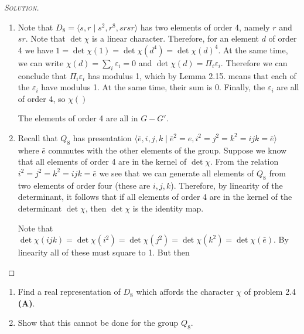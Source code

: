 \begin{proof}[{\scshape Solution}]
\begin{enumerate}[font=\normalfont,label=\textbf{(\Alph*)}, wide]
    \item Note that $D_8 = \langle s, r \mid s^2, r^8, srsr \rangle$ has two elements of order 4, namely $r$ and $sr$. Note that $\det{\chi}$ is a linear character. Therefore, for an element $d$ of order 4 we have $1 = \det{\chi}(1) = \det{\chi}(d^4) = \det{\chi}(d)^4$. At the same time, we can write $\chi(d) = \sum_i \varepsilon_i = 0$ and $\det{\chi}(d) = \Pi_i \varepsilon_i$. Therefore we can conclude that $\Pi_i \varepsilon_i$ has modulus 1, which by Lemma 2.15. means that each of the $\varepsilon_i$ have modulus 1. At the same time, their sum is 0. Finally, the $\varepsilon_i$ are all of order 4, so $\chi()$

    The elements of order 4 are all in $G - G'$.
    \item Recall that $Q_8$ has presentation
    $\langle \bar{e}, i, j, k \mid \bar{e}^2 = e, i^2 = j^2 = k^2 = ijk = \bar{e} \rangle$ where $\bar{e}$ commutes with the other elements of the group. Suppose we know that all elements of order 4 are in the kernel of $\det{\chi}$. From the relation $i^2 = j^2 = k^2 = ijk = \bar{e}$ we see that we can generate all elements of $Q_8$ from two elements of order four (these are $i, j, k$). Therefore, by linearity of the determinant, it follows that if all elements of order 4 are in the kernel of the determinant $\det{\chi}$, then $\det{\chi}$ is the identity map.

    Note that $\det{\chi}(ijk) = \det{\chi}(i^2) = \det{\chi}(j^2) = \det{\chi}(k^2) = \det{\chi}(\bar{e})$. By linearity all of these must square to 1. But then
  \end{enumerate}
\end{proof}

\newpage
\begin{problem}[2.5]
\hfill

\begin{enumerate}[font=\normalfont,label=\textbf{(\Alph*)}]
  \item Find a real representation of $D_8$ which affords the character $\chi$ of problem 2.4 \textbf{(A)}.
  \item Show that this cannot be done for the group $Q_8$.
\end{enumerate}
\end{problem}

